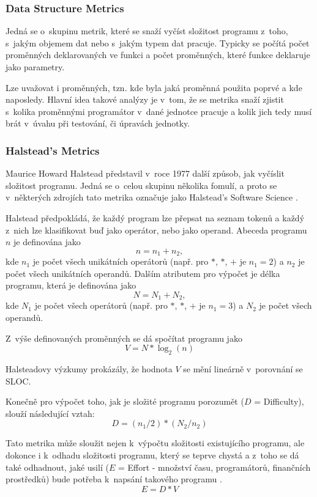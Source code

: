 \documentclass[11pt,twoside,a4paper]{book}
\begin{document}
\subsubsection{Data Structure Metrics}
Jedná se o~skupinu metrik, které se snaží vyčíst složitost programu z~toho, s~jakým objemem dat nebo s~jakým typem dat pracuje.
Typicky se počítá počet proměnných deklarovaných ve funkci a počet proměnných, které funkce deklaruje jako parametry.

Lze uvažovat i  proměnných, tzn. kde byla jaká proměnná použita poprvé a kde naposledy. Hlavní idea takové analýzy je v~tom,
že se metrika snaží zjistit s~kolika proměnnými programátor v~dané jednotce pracuje a kolik jich tedy musí brát
v~úvahu při testování, či úpravách jednotky.

\subsubsection{Halstead's Metrics}
Maurice Howard Halstead představil v~roce 1977 další způsob, jak vyčíslit složitost programu. Jedná se o~celou skupinu několika fomulí,
a proto se v~některých zdrojích tato metrika označuje jako Halstead's Software Science \cite{SWQMetrics}.

Halstead předpokládá, že každý program lze přepsat na seznam tokenů a každý z~nich lze klasifikovat buď jako operátor, nebo jako operand.
Abeceda programu $n$ je definována jako
$$n = n_1 + n_2,$$
kde $n_1$ je počet všech unikátních operátorů (např. pro $*$, $*$, $+$ je $n_1 = 2$) a $n_2$ je počet všech unikátních operandů.
Dalším atributem pro výpočet je délka programu, která je definována jako
$$N = N_1 + N_2,$$
kde $N_1$ je počet všech operátorů (např. pro $*$, $*$, $+$ je $n_1 = 3$) a $N_2$ je počet všech operandů.

Z~výše definovaných proměnných se dá spočítat  programu jako
$$V = N*\log_2{(n)}$$

Halsteadovy výzkumy prokázály, že hodnota $V$ se mění lineárně v~porovnání se SLOC.

Konečně pro výpočet toho, jak je složité programu porozumět ($D$ = Difficulty), slouží následující vztah:
$$D = (n_1 / 2) * (N_2 / n_2)$$

Tato metrika může sloužit nejen k~výpočtu složitosti existujícího programu, ale dokonce i k~odhadu složitosti programu,
který se teprve chystá a z~toho se dá také odhadnout, jaké usilí ($E$ = Effort - množství času, programátorů, finančních prostředků)
bude potřeba k~napsání takového programu \cite{MILLS88}.
$$E = D * V$$
\end{document}
